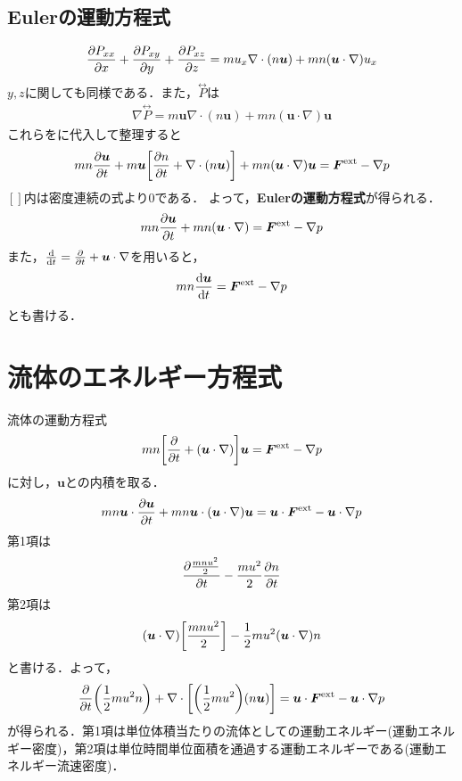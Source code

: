 \documentclass{report}
\begin{document}
  \subsection{Eulerの運動方程式}
    \begin{align}
      \pdv{P_{xx}}{x} + \pdv{P_{xy}}{y} + \pdv{P_{xz}}{z} = mu_x \nabla \cdot (n\bm{u}) + mn(\bm{u} \cdot \nabla)u_x
    \end{align}
    $y,z$に関しても同様である．また，$\overset{\leftrightarrow}{P}$は
    \begin{align}
      \nabla \overset{\leftrightarrow}{P} = m\bm{u} \nabla \cdot (n\bm{u}) + mn(\bm{u} \cdot \nabla)\bm{u}
    \end{align}
    これらをに代入して整理すると
    \begin{align}
      mn\pdv{\bm{u}}{t} + m\bm{u} \qty[\pdv{n}{t} + \nabla \cdot (n\bm{u})] + mn(\bm{u} \cdot \nabla)\bm{u} = \bm{F}^{\mathrm{ext}} - \nabla p
    \end{align}
    $[]$内は密度連続の式より0である．
    よって，\textbf{Eulerの運動方程式}が得られる．
    \begin{align}
      mn\pdv{\bm{u}}{t} + mn(\bm{u} \cdot \nabla) = \bm{F}^{\mathrm{ext}} - \nabla p
    \end{align}
    また，$\dv{t} = \pdv{t} + \bm{u} \cdot \nabla$を用いると，
    \begin{align}
      mn\dv{\bm{u}}{t} = \bm{F}^{\mathrm{ext}} - \nabla p
    \end{align}
    とも書ける．

\section{流体のエネルギー方程式}
  流体の運動方程式
  \begin{align}
    mn\qty[\pdv{t} + (\bm{u} \cdot \nabla)]\bm{u} = \bm{F}^{\mathrm{ext}} - \nabla p
  \end{align}
  に対し，$\bm{u}$との内積を取る．
  \begin{align}
    mn\bm{u} \cdot \pdv{\bm{u}}{t} + mn\bm{u} \cdot (\bm{u} \cdot \nabla)\bm{u} = \bm{u} \cdot \bm{F}^{\mathrm{ext}} - \bm{u} \cdot \nabla p
  \end{align}
  第1項は
  \begin{align}
    \pdv{\frac{mnu^2}{2}}{t} - \frac{mu^2}{2} \pdv{n}{t}
  \end{align}
  第2項は
  \begin{align}
    (\bm{u} \cdot \nabla) \qty[\frac{mnu^2}{2}] - \frac{1}{2}mu^2 (\bm{u} \cdot \nabla)n
  \end{align}
  と書ける．よって，
  \begin{align}
    \pdv{t} \qty(\frac{1}{2} mu^2 n) + \nabla \cdot \qty[\qty(\frac{1}{2} mu^2)(n\bm{u})] = \bm{u} \cdot \bm{F}^{\mathrm{ext}} - \bm{u} \cdot \nabla p \label{eq:energy}
  \end{align}
  が得られる．第1項は単位体積当たりの流体としての運動エネルギー(運動エネルギー密度)，第2項は単位時間単位面積を通過する運動エネルギーである(運動エネルギー流速密度)．
\end{document}

